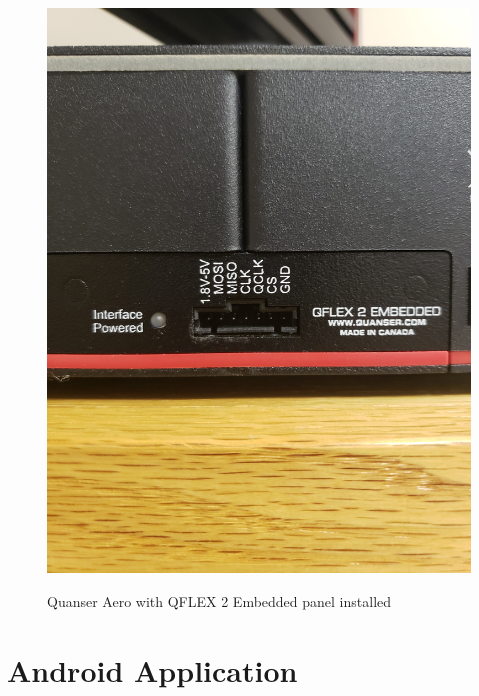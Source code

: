 \begin{figure}[!h]
    \centering
    \includegraphics[angle = 270,width=.248\textwidth,keepaspectratio=true]{figs/img/Embedded_Panel.jpg}
    \label{fig:Embedded_Panel}
    \caption{Quanser Aero with QFLEX 2 Embedded panel installed}
\end{figure}
\section{Android Application}


